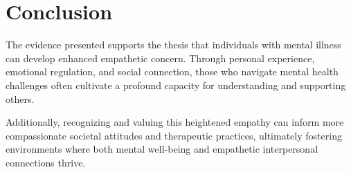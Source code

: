 \documentclass[stu]{apa7}
\begin{document}







\section{Conclusion}

The evidence presented supports the thesis that individuals with mental illness can develop enhanced empathetic concern. Through personal experience, emotional regulation, and social connection, those who navigate mental health challenges often cultivate a profound capacity for understanding and supporting others.  

Additionally, recognizing and valuing this heightened empathy can inform more compassionate societal attitudes and therapeutic practices, ultimately fostering environments where both mental well-being and empathetic interpersonal connections thrive.

\printbibliography
\end{document}
